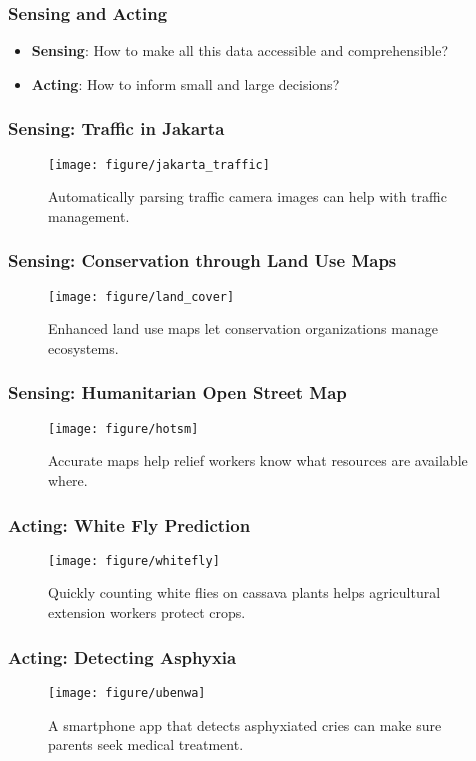 \documentclass[10pt,mathserif]{beamer}
\begin{document}
\begin{frame}
  \frametitle{Sensing and Acting}
  \begin{itemize}
  \item \textbf{Sensing}: How to make all this data accessible and comprehensible?
  \item \textbf{Acting}: How to inform small and large decisions?
  \end{itemize}
\end{frame}

\begin{frame}
  \frametitle{Sensing: Traffic in Jakarta}
  \begin{figure}[ht]
    \centering
    \texttt{[image: figure/jakarta\_traffic]}
    \caption{Automatically parsing traffic camera images can help with traffic
      management. \label{fig:label} }
  \end{figure}
\end{frame}

\begin{frame}
  \frametitle{Sensing: Conservation through Land Use Maps}
  \begin{figure}[ht]
    \centering
    \texttt{[image: figure/land\_cover]}
    \caption{Enhanced land use maps let conservation organizations manage
      ecosystems. \label{fig:land_use} }
  \end{figure}
\end{frame}

\begin{frame}
  \frametitle{Sensing: Humanitarian Open Street Map}
  \begin{figure}[ht]
    \centering
    \texttt{[image: figure/hotsm]}
    \caption{Accurate maps help relief workers know what resources are available
      where. \label{fig:hotsm} }
  \end{figure}
\end{frame}

\begin{frame}
  \frametitle{Acting: White Fly Prediction}
  \begin{figure}[ht]
    \centering
    \texttt{[image: figure/whitefly]}
    \caption{Quickly counting white flies on cassava plants helps agricultural
      extension workers protect crops. \label{fig:whitefly} }
  \end{figure}
\end{frame}

\begin{frame}
  \frametitle{Acting: Detecting Asphyxia}
  \begin{figure}[ht]
    \centering
    \texttt{[image: figure/ubenwa]}
    \caption{A smartphone app that detects asphyxiated cries can make sure
      parents seek medical treatment.
      \label{fig:asphyx} }
  \end{figure}
\end{frame}
\end{document}
